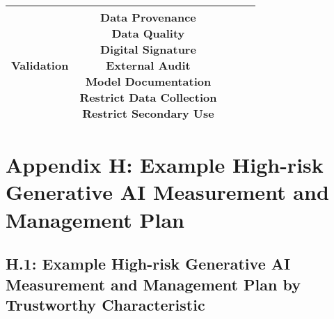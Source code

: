 \documentclass[fleqn]{article}
\begin{document}
\begin{landscape}
\begin{table}[H]
\begin{tabular}{|c|c|c|c|c|}
{			\textbullet\hspace{3pt} Validation\\ 	
		}
		& \makecell[l]{
			\textbullet\hspace{3pt} Data Provenance\\ 	
			\textbullet\hspace{3pt} Data Quality\\ 	
			\textbullet\hspace{3pt} Digital Signature\\ 	
			\textbullet\hspace{3pt} External Audit\\ 	
			\textbullet\hspace{3pt} Model Documentation \\ 
			\textbullet\hspace{3pt} Restrict Data Collection\\ 				
			\textbullet\hspace{3pt} Restrict Secondary Use\\ 							 	 
		} 
		\\
		\hline
	\end{tabular}
	\label{table:med_risk_plan_by_gai_risk_cont2}
\end{table}

\vfill
\raisebox{-10pt}{\makebox[\linewidth]{\thepage}}

\pagebreak
\thispagestyle{empty}

\section*{Appendix H: Example High-risk Generative AI Measurement and Management Plan}\label{sec:appndxh}

\subsection*{H.1: Example High-risk Generative AI Measurement and Management Plan by Trustworthy Characteristic}\label{appdxh1}


\end{landscape}
\end{document}
